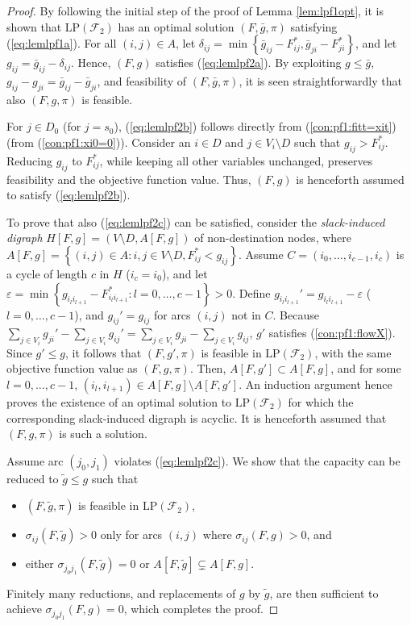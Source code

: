 \begin{proof}
By following the initial step of the proof of Lemma \ref{lem:lpf1opt},
it is shown that $\text{LP}(\mathcal{F}_2)$ has an optimal solution $(F,\bar{g},\pi)$ satisfying (\ref{eq:lemlpf1a}).
For all $(i,j)\in A$, let $\delta_{ij}=\min\left\{\bar{g}_{ij}-F_{ij}^*, \bar{g}_{ji}-F_{ji}^*\right\}$,
and let $g_{ij}=\bar{g}_{ij}-\delta_{ij}$.
Hence, $(F,g)$ satisfies (\ref{eq:lemlpf2a}).
By exploiting $g\leq\bar{g}$, $g_{ij}-g_{ji}=\bar{g}_{ij}-\bar{g}_{ji}$, and feasibility of $(F,\bar{g},\pi)$,
it is seen straightforwardly that also $(F,g,\pi)$ is feasible.

For $j\in D_0$ (for $j=s_0$), (\ref{eq:lemlpf2b}) follows directly from (\ref{con:pf1:fitt=xit}) (from (\ref{con:pf1:xi0=0})).
Consider an $i\in D$ and $j\in V_i\setminus D$ such that $g_{ij}>F_{ij}^*$.
Reducing $g_{ij}$ to $F_{ij}^*$, while keeping all other variables unchanged, preserves feasibility and the objective function value.
Thus, $(F,g)$ is henceforth assumed to satisfy (\ref{eq:lemlpf2b}).

To prove that also (\ref{eq:lemlpf2c}) can be satisfied,
consider the \emph{slack-induced digraph} $H[F,g]=(V\setminus D,A[F,g])$ of non-destination nodes, where
$A[F,g]=\left\{(i,j)\in A: i,j\in V\setminus D, F_{ij}^* < g_{ij}\right\}$.
Assume $C=(i_0,\ldots,i_{c-1}, i_c)$ is a cycle of length $c$ in $H$ ($i_c=i_0$),
and let $\varepsilon = \min\left\{g_{i_li_{l+1}}-F_{i_li_{l+1}}^*: l=0,\ldots,c-1\right\}>0$.
Define $g_{i_li_{l+1}}'=g_{i_li_{l+1}}-\varepsilon$ ($l=0,\ldots,c-1$), and $g_{ij}'=g_{ij}$ for arcs $(i,j)$ not in $C$.
Because $\sum_{j\in V_i}g_{ji}'-\sum_{j\in V_i}g_{ij}' = \sum_{j\in V_i}g_{ji}-\sum_{j\in V_i}g_{ij}$,
$g'$ satisfies (\ref{con:pf1:flowX}).
Since $g'\leq g$, it follows that $(F,g',\pi)$ is feasible in $\text{LP}(\mathcal{F}_2)$, with the same objective function value as $(F,g,\pi)$.
Then, $A[F,g']\subset A[F,g]$, and for some $l=0,\ldots,c-1$, $(i_l,i_{l+1})\in A[F,g]\setminus A[F,g']$.
An induction argument hence proves the existence of an optimal solution to $\text{LP}(\mathcal{F}_2)$ for which the corresponding slack-induced digraph is acyclic.
It is henceforth assumed that $(F,g,\pi)$ is such a solution.

Assume arc $(j_0,j_1)$ violates (\ref{eq:lemlpf2c}).
We show that the capacity can be reduced to $\tilde{g}\leq g$ such that
\begin{itemize}
  \item $(F,\tilde{g},\pi)$ is feasible in $\text{LP}(\mathcal{F}_2)$,
  \item $\sigma_{ij}(F,\tilde{g})>0$ only for arcs $(i,j)$ where $\sigma_{ij}(F,g)>0$, and
  \item either $\sigma_{j_0j_1}(F,\tilde{g})=0$ or $A[F,\tilde{g}]\subsetneq A[F,g]$.
\end{itemize}
\noindent
Finitely many reductions, and replacements of $g$ by $\tilde{g}$, are then sufficient to achieve $\sigma_{j_0j_1}(F,g)=0$, which completes the proof.


\end{proof}
